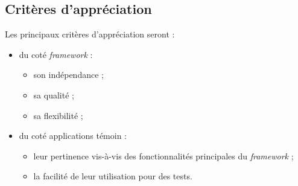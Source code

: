 \subsection{Critères d’appréciation}

Les principaux critères d'appréciation seront : 

\begin{itemize}
 \item du coté \emph{framework} :
 \begin{itemize} 
  \item son indépendance ;
  \item sa qualité ;
  \item sa flexibilité ;
 \end{itemize} 
 
 \item du coté applications témoin :
 \begin{itemize}
  \item leur pertinence vis-à-vis des fonctionnalités principales du \emph{framework} ;
  \item la facilité de leur utilisation pour des tests.
 \end{itemize}
\end{itemize}


